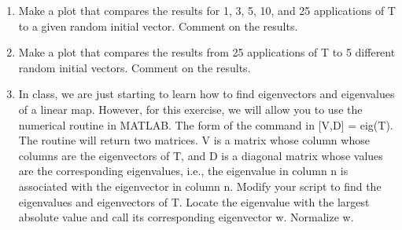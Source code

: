\documentclass[fleqn]{article}
\begin{document}
\begin{enumerate}[nolistsep]
\begin{enumerate}
				\item Make a plot that compares the results for 1, 3, 5, 10, and 25 applications of T to a given random initial vector. Comment on the results.
				
				\item Make a plot that compares the results from 25 applications of T to 5 different random initial vectors. Comment on the results.
				
				\item In class, we are just starting to learn how to find eigenvectors and eigenvalues of a linear map. However, for this exercise, we will allow you to use the numerical routine in MATLAB. The form of the command in [V,D] = eig(T). The routine will return two matrices. V is a matrix whose column whose columns are the eigenvectors of T, and D is a diagonal matrix whose values are the corresponding eigenvalues, i.e., the eigenvalue in column n is associated with the eigenvector in column n. Modify your script to find the eigenvalues and eigenvectors of T. Locate the eigenvalue with the largest absolute value and call its corresponding eigenvector w. Normalize w.
			\end{enumerate}
	\end{enumerate}
\end{document}
